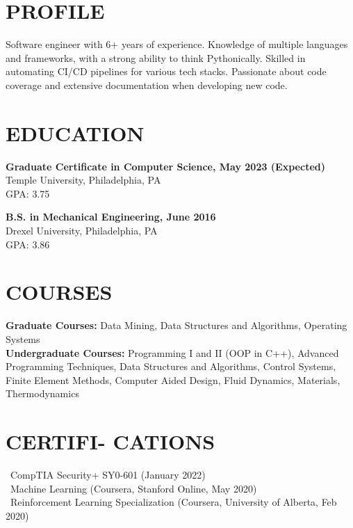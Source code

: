 \documentclass[line,resmargin]{res}
\begin{document}
\address{ https://www.andygnias.com/ }
\begin{resume}

\section{PROFILE}
Software engineer with 6+ years of experience. Knowledge of multiple languages and frameworks, with a strong ability to think Pythonically. 
Skilled in automating CI/CD pipelines for various tech stacks. Passionate about code coverage and extensive documentation when developing new code.
 
\section{EDUCATION}
\textbf{Graduate Certificate in Computer Science, May 2023 (Expected)} \\
Temple University, Philadelphia, PA \\
GPA: 3.75

\textbf{B.S. in Mechanical Engineering, June 2016} \\
Drexel University, Philadelphia, PA \\
GPA: 3.86

\section{COURSES}
\textbf{Graduate Courses:} Data Mining, Data Structures and Algorithms, Operating Systems \\
\textbf{Undergraduate Courses:} Programming I and II (OOP in C++), Advanced Programming Techniques, Data Structures and Algorithms, Control Systems, Finite Element Methods, Computer Aided Design, Fluid Dynamics, Materials, Thermodynamics

\section{CERTIFI- CATIONS}
\textbullet\ CompTIA Security+ SY0-601 (January 2022) \\
\textbullet\ Machine Learning (Coursera, Stanford Online, May 2020) \\
\textbullet\ Reinforcement Learning Specialization (Coursera, University of Alberta, Feb 2020)
	

\end{resume}
\end{document}
